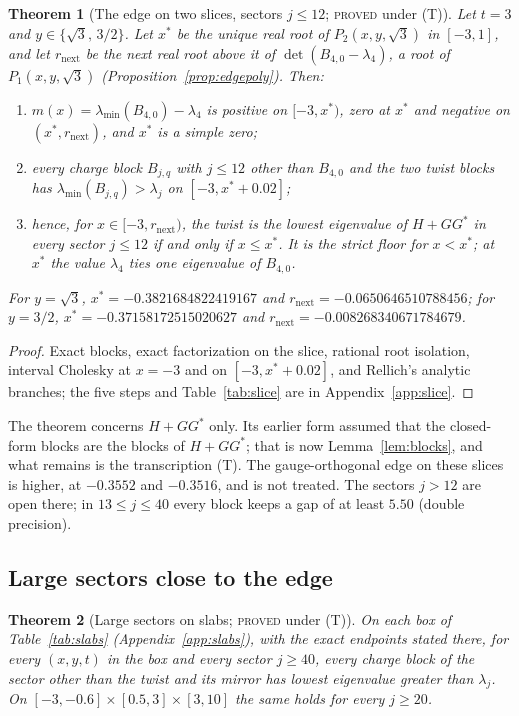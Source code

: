 \documentclass[11pt]{article}
\newtheorem{theorem}{Theorem}[section]
\theoremstyle{definition}
\theoremstyle{remark}
\newcommand{\PROVEDT}{\textsc{proved} under (T)}
\begin{document}
\begin{theorem}[The edge on two slices, sectors $j\le12$; \PROVEDT]\label{thm:slice}
Let $t=3$ and $y\in\{\sqrt3,\,3/2\}$. Let $x^*$ be the unique real root of $P_2(x,y,\sqrt3)$ in $[-3,1]$, and let
$r_{\mathrm{next}}$ be the next real root above it of $\det(B_{4,0}-\lambda_4)$, a root of $P_1(x,y,\sqrt3)$
(Proposition~\ref{prop:edgepoly}). Then:
\begin{enumerate}
  \item $m(x)=\lambda_{\min}(B_{4,0})-\lambda_4$ is positive on $[-3,x^*)$, zero at $x^*$ and negative on
  $(x^*,r_{\mathrm{next}})$, and $x^*$ is a simple zero;
  \item every charge block $B_{j,q}$ with $j\le12$ other than $B_{4,0}$ and the two twist blocks has
  $\lambda_{\min}(B_{j,q})>\lambda_j$ on $[-3,x^*+0.02]$;
  \item hence, for $x\in[-3,r_{\mathrm{next}})$, the twist is the lowest eigenvalue of $H+GG^*$ in every sector $j\le12$
  if and only if $x\le x^*$. It is the strict floor for $x<x^*$; at $x^*$ the value $\lambda_4$ ties one eigenvalue of
  $B_{4,0}$.
\end{enumerate}
For $y=\sqrt3$, $x^*=-0.3821684822419167$ and $r_{\mathrm{next}}=-0.0650646510788456$; for $y=3/2$,
$x^*=-0.37158172515020627$ and $r_{\mathrm{next}}=-0.008268340671784679$.
\end{theorem}

\begin{proof}
Exact blocks, exact factorization on the slice, rational root isolation, interval Cholesky at $x=-3$ and on
$[-3,x^*+0.02]$, and Rellich's analytic branches; the five steps and Table~\ref{tab:slice} are in
Appendix~\ref{app:slice}.
\end{proof}

The theorem concerns $H+GG^*$ only. Its earlier form assumed that the closed-form blocks are the blocks of $H+GG^*$;
that is now Lemma~\ref{lem:blocks}, and what remains is the transcription (T). The gauge-orthogonal edge on these slices
is higher, at $-0.3552$ and $-0.3516$, and is not treated. The sectors $j>12$ are open there; in $13\le j\le40$ every
block keeps a gap of at least $5.50$ (double precision).

\subsection{Large sectors close to the edge}

\begin{theorem}[Large sectors on slabs; \PROVEDT]\label{thm:slabs}
On each box of Table~\ref{tab:slabs} (Appendix~\ref{app:slabs}), with the exact endpoints stated there, for every $(x,y,t)$ in the box and every sector
$j\ge40$, every charge block of the sector other than the twist and its mirror has lowest eigenvalue greater than
$\lambda_j$. On $[-3,-0.6]\times[0.5,3]\times[3,10]$ the same holds for every $j\ge20$.
\end{theorem}
\end{document}
